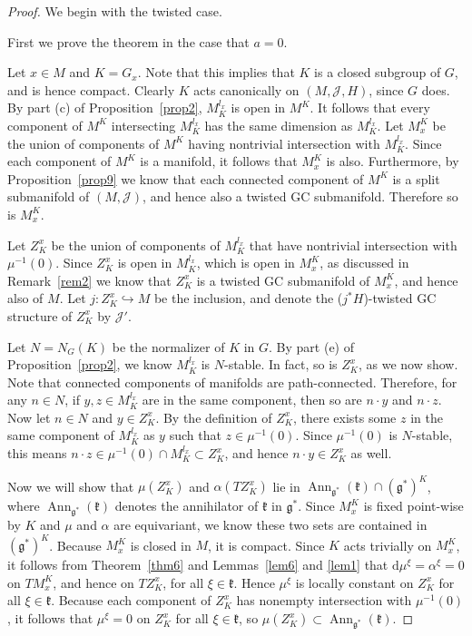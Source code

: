 \documentclass[pdftex]{sigma}
\numberwithin{equation}{section}
\newcommand{\hookfunc}[3]{#1 \colon #2 \hookrightarrow #3}
\newcommand{\tang}{T}
\begin{document}
\begin{proof}
We begin with the twisted case.

First we prove the theorem in the case that $a=0$.

Let $x \in M$ and $K = G_x$.
Note that this implies that $K$ is a closed subgroup of $G$, and is hence compact.
Clearly $K$ acts canonically on $(M,\mathcal{J},H)$, since $G$ does.
By part (c) of Proposition~\ref{prop2}, $M_K^{l_x}$ is open in $M^K$.
It follows that every component of $M^K$ intersecting $M_K^{l_x}$ has the same dimension as $M_K^{l_x}$.
Let $M_x^K$ be the union of components of $M^K$ having nontrivial intersection with $M_K^{l_x}$.
Since each component of $M^K$ is a manifold, it follows that $M_x^K$ is also.
Furthermore, by Proposition~\ref{prop9} we know that each connected component of $M^K$ is a split submanifold of $(M,\mathcal{J})$, and hence also a twisted GC submanifold.
Therefore so is $M_x^K$.

Let $Z_K^x$ be the union of components of $M_K^{l_x}$ that have nontrivial intersection with $\mu^{-1}(0)$.
Since $Z_K^x$ is open in $M_K^{l_x}$, which is open in $M_x^K$, as discussed in Remark~\ref{rem2} we know that $Z_K^x$ is a twisted GC submanifold of $M_x^K$, and hence also of $M$.
Let $\hookfunc{j}{Z_K^x}{M}$ be the inclusion, and denote the ($j^*H$)-twisted GC structure of $Z_K^x$ by $\mathcal{J}'$.

Let $N=N_G(K)$ be the normalizer of $K$ in $G$.  By part (e) of Proposition~\ref{prop2}, we know $M_K^{l_x}$ is $N$-stable.  In fact, so is $Z_K^x$, as we now show.  Note that connected components of manifolds are path-connected.  Therefore, for any $n \in N$, if $y,z \in M_K^{l_x}$ are in the same component, then so are $n \cdot y$ and $n \cdot z$.
Now let $n \in N$ and $y \in Z_K^x$.
By the def\/inition of $Z_K^x$, there exists some $z$ in the same component of $M_K^{l_x}$ as $y$ such that $z \in \mu^{-1}(0)$.
Since $\mu^{-1}(0)$ is $N$-stable, this means $n \cdot z \in \mu^{-1}(0) \cap M_K^{l_x} \subset Z_K^x$, and hence $n \cdot y \in Z_K^x$ as well.

Now we will show that $\mu(Z_K^x)$ and $\alpha( \tang Z_K^x)$ lie in $\operatorname{Ann}_{\mathfrak{g}^*} (\mathfrak{k}) \cap (\mathfrak{g}^*)^K$, where $\operatorname{Ann}_{\mathfrak{g}^*} (\mathfrak{k})$ denotes the annihilator of $\mathfrak{k}$ in $\mathfrak{g}^*$.
Since $M_x^K$ is f\/ixed point-wise by $K$ and $\mu$ and $\alpha$ are equivariant, we know these two sets are contained in $(\mathfrak{g}^*)^K$.
Because $M_x^K$ is closed in $M$, it is compact.  Since $K$ acts trivially on $M_x^K$, it follows from Theorem~\ref{thm6} and Lemmas~\ref{lem6} and \ref{lem1} that $\mathrm{d} \mu^{\xi} = \alpha^{\xi} = 0$ on $\tang M_x^K$, and hence on $\tang Z_K^x$, for all $\xi \in \mathfrak{k}$.
Hence $\mu^{\xi}$ is locally constant on $Z_K^x$ for all $\xi \in \mathfrak{k}$.
Because each component of $Z_K^x$ has nonempty intersection with $\mu^{-1}(0)$, it follows that $\mu^{\xi} = 0$ on $Z_K^x$ for all $\xi \in \mathfrak{k}$, so $\mu(Z_K^x) \subset \operatorname{Ann}_{\mathfrak{g}^*} (\mathfrak{k})$.


\end{proof}
\end{document}
